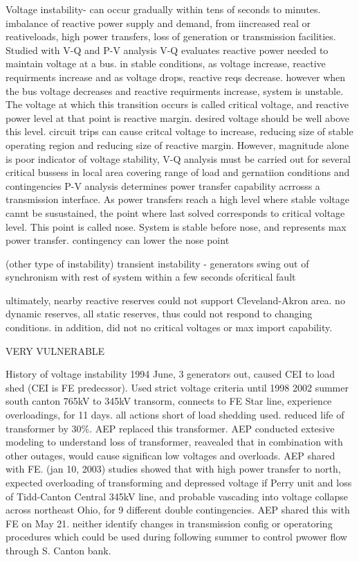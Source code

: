 Voltage instability- can occur gradually within tens of seconds to minutes. imbalance of reactive power supply and demand, from iincreased real or reativeloads, high power transfers, loss of generation or transmission facilities.  Studied with V-Q and P-V analysis
V-Q evaluates reactive power needed to maintain voltage at a bus.  in stable conditions, as voltage increase, reactive requirments increase and as voltage drops, reactive reqs decrease.  however when the bus voltage decreases and reactive requirments increase, system is unstable.  The voltage at which this transition occurs is called critical voltage, and reactive power level at that point is reactive margin.  desired voltage should be well above this level.  circuit trips can cause critcal voltage to increase, reducing size of stable operating region and reducing size of reactive margin.
However, magnitude alone is poor indicator of voltage stability, V-Q analysis must be carried out for several critical bussess in local area covering range of load and gernatiion conditions and contingencies
P-V analysis determines power transfer capability acrrosss a transmission interface.  As power transfers reach a high level where stable voltage cannt be susustained, the point where last solved corresponds to critical voltage level.  This point is called nose.  System is stable before nose, and represents max power transfer.  contingency can lower the nose point

(other type of instability)
transient instability - generators swing out of synchronism with rest of system within a few seconds ofcritical fault

ultimately, nearby reactive reserves could not support Cleveland-Akron area.
no dynamic reserves, all static reserves, thus could not respond to changing conditions.  in addition, did not no critical voltages or max import capability.

VERY VULNERABLE

History of voltage instability
1994 June, 3 generators out, caused CEI to load shed (CEI is FE predecssor).  Used strict voltage criteria until 1998
2002 summer south canton 765kV to 345kV transorm, connects to FE Star line, experience overloadings, for 11 days. all actions short of load shedding used.  reduced life of transformer by 30\%.  AEP replaced this transformer.  AEP conducted extesive modeling to understand loss of transformer, reavealed that in combination with other outages, would cause significan low voltages and overloads.  AEP shared with FE. (jan 10, 2003)
studies showed that with high power transfer to north, expected overloading of transforming and depressed voltage if Perry unit and loss of Tidd-Canton Central 345kV line, and probable vascading into voltage collapse across northeast Ohio, for 9 different double contingencies.
AEP shared this with FE on May 21.  neither identify changes in transmission config or operatoring procedures which could be used during following summer to control pwower flow through S. Canton bank.

